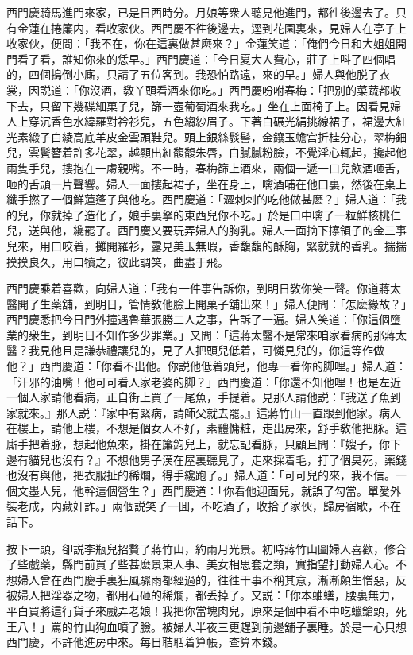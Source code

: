 西門慶騎馬進門來家，已是日西時分。月娘等衆人聽見他進門，都徃後邊去了。只有金蓮在捲簾内，看收家伙。西門慶不徃後邊去，逕到花園裏來，見婦人在亭子上收家伙，便問：「我不在，你在這裏做甚麽來？」金蓮笑道：「俺們今日和大姐姐開門看了看，誰知你來的恁早。」西門慶道：「今日夏大人費心，莊子上呌了四個唱的，四個搗倒小廝，只請了五位客到。我恐怕路遠，來的早。」婦人與他脱了衣裳，因説道：「你沒酒，敎丫頭看酒來你吃。」西門慶吩咐春梅：「把別的菜蔬都收下去，只留下幾碟細菓子兒，篩一壺葡萄酒來我吃。」坐在上面椅子上。因看見婦人上穿沉香色水緯羅對衿衫兒，五色縐紗眉子。下著白碾光絹挑線裙子，裙邊大紅光素緞子白綾高底羊皮金雲頭鞋兒。頭上銀絲䯼髻，金鑲玉蟾宫折桂分心，翠梅鈿兒，雲鬢簪着許多花翠，越顯出紅馥馥朱唇，白膩膩粉臉，不覺淫心輒起，攙起他兩隻手兒，摟抱在一䖏親嘴。不一時，春梅篩上酒來，兩個一遞一口兒飲酒咂舌，咂的舌頭一片聲響。婦人一面摟起裙子，坐在身上，噙酒哺在他口裏，然後在桌上纖手撚了一個鮮蓮蓬子與他吃。西門慶道：「澀剌剌的吃他做甚麽？」婦人道：「我的兒，你就掉了造化了，娘手裏拏的東西兒你不吃。」於是口中噙了一粒鮮核桃仁兒，送與他，纔罷了。西門慶又要玩弄婦人的胸乳。婦人一面摘下㩟領子的金三事兒來，用口咬着，攤開羅衫，露見美玉無瑕，香馥馥的酥胸，緊就就的香乳。揣揣摸摸良久，用口犢之，彼此調笑，曲盡于飛。

西門慶乘着喜歡，向婦人道：「我有一件事告訴你，到明日敎你笑一聲。你道蔣太醫開了生薬舖，到明日，管情敎他臉上開菓子舖出來！」婦人便問：「怎麽緣故？」西門慶悉把今日門外撞遇魯華張勝二人之事，告訴了一遍。婦人笑道：「你這個墮業的衆生，到明日不知作多少罪業。」又問：「這蔣太醫不是常來咱家看病的那蔣太醫？我見他且是謙恭禮讓兒的，見了人把頭兒低着，可憐見兒的，你這等作做他？」西門慶道：「你看不出他。你説他低着頭兒，他專一看你的脚哩。」婦人道：「汗邪的油嘴！他可可看人家老婆的脚？」西門慶道：「你還不知他哩！也是左近一個人家請他看病，正自街上買了一尾魚，手提着。見那人請他説：『我送了魚到家就來。』那人説：『家中有緊病，請師父就去罷。』這蔣竹山一直跟到他家。病人在樓上，請他上樓，不想是個女人不好，素體慵粧，走出房來，舒手敎他把脉。這廝手把着脉，想起他魚來，掛在簾鉤兒上，就忘記看脉，只顧且問：『嫂子，你下邊有貓兒也沒有？』不想他男子漢在屋裏聽見了，走來採着毛，打了個臭死，薬錢也沒有與他，把衣服扯的稀爛，得手纔跑了。」婦人道：「可可兒的來，我不信。一個文墨人兒，他幹這個營生？」西門慶道：「你看他迎面兒，就誤了勾當。單愛外裝老成，内藏奸詐。」兩個説笑了一囬，不吃酒了，收拾了家伙，歸房宿歇，不在話下。

按下一頭，卻説李瓶兒招贅了蔣竹山，約兩月光景。初時蔣竹山圖婦人喜歡，修合了些戲薬，縣門前買了些甚麽景東人事、美女相思套之類，實指望打動婦人心。不想婦人曾在西門慶手裏狂風驟雨都經過的，徃徃干事不稱其意，漸漸頗生憎惡，反被婦人把淫器之物，都用石砸的稀爛，都丢掉了。又説：「你本蛐蟮，腰裏無力，平白買將這行貨子來戲弄老娘！我把你當塊肉兒，原來是個中看不中吃蠟鎗頭，死王八！」罵的竹山狗血噴了臉。被婦人半夜三更趕到前邊舖子裏睡。於是一心只想西門慶，不許他進房中來。每日聐聒着算帳，查算本錢。

